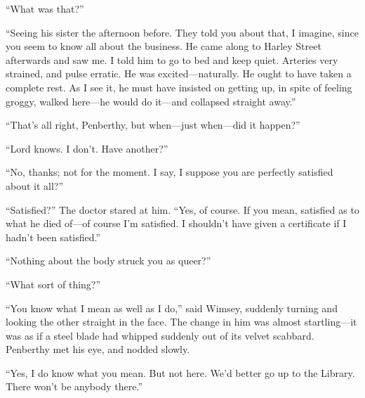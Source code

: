 \enquote{What was that?}

\enquote{Seeing his sister the afternoon before. They told you about that, I imagine, since you seem to know all about the business. He came along to Harley Street afterwards and saw me. I told him to go to bed and keep quiet. Arteries very strained, and pulse erratic. He was excited\allowbreak---\allowbreak naturally. He ought to have taken a complete rest. As I see it, he must have insisted on getting up, in spite of feeling groggy, walked here\allowbreak---\allowbreak he would do it\allowbreak---\allowbreak and collapsed straight away.}

\enquote{That's all right, Penberthy, but when\allowbreak---\allowbreak just when\allowbreak---\allowbreak did it happen?}

\enquote{Lord knows. I don't. Have another?}

\enquote{No, thanks; not for the moment. I say, I suppose you are perfectly satisfied about it all?}

\enquote{Satisfied?} The doctor stared at him. \enquote{Yes, of course. If you mean, satisfied as to what he died of\allowbreak---\allowbreak of course I'm satisfied. I shouldn't have given a certificate if I hadn't been satisfied.}

\enquote{Nothing about the body struck you as queer?}

\enquote{What sort of thing?}

\enquote{You know what I mean as well as I do,} said Wimsey, suddenly turning and looking the other straight in the face. The change in him was almost startling\allowbreak---\allowbreak it was as if a steel blade had whipped suddenly out of its velvet scabbard. Penberthy met his eye, and nodded slowly.

\enquote{Yes, I do know what you mean. But not here. We'd better go up to the Library. There won't be anybody there.}
